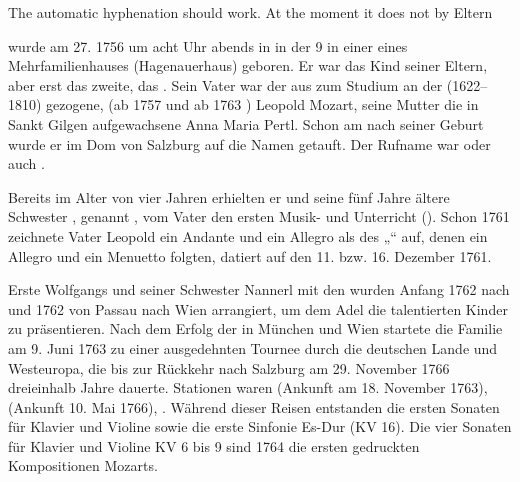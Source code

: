 \documentclass{article}
\begin{document}
{The automatic hyphenation should work.
At the moment it does not by Eltern}

 wurde am 27.  1756 um acht
Uhr abends in  in der  9 in einer
 eines Mehrfamilienhauses
(Hagenauerhaus) geboren. Er war das  Kind seiner Eltern,
aber erst das zweite, das . Sein Vater war der aus
 zum Studium an der 
(1622–1810)  gezogene,  (ab 1757  und ab 1763
) Leopold Mozart, seine Mutter die in Sankt
Gilgen aufgewachsene Anna Maria Pertl. Schon am  nach
seiner Geburt wurde er im Dom von Salzburg auf die Namen  getauft. Der Rufname war  oder auch .

Bereits im Alter von vier Jahren erhielten er und seine fünf Jahre
ältere Schwester , genannt
, vom Vater den ersten Musik- und
 Unterricht (). Schon 1761 zeichnete Vater Leopold ein Andante und ein
Allegro als des „“ auf, denen ein
Allegro und ein Menuetto folgten, datiert auf den 11. bzw. 16. Dezember
1761. 

Erste  Wolfgangs und seiner Schwester Nannerl mit
den  wurden Anfang 1762 nach  und
 1762 von Passau nach Wien arrangiert, um dem Adel die
talentierten Kinder zu präsentieren. Nach dem Erfolg der
 in München und Wien startete die Familie
am 9. Juni 1763 zu einer ausgedehnten Tournee durch die deutschen Lande
und Westeuropa, die bis zur Rückkehr nach Salzburg am 29. November 1766
dreieinhalb Jahre dauerte. Stationen waren  (Ankunft am 18. November
1763), (Ankunft
10. Mai 1766), . Während dieser Reisen entstanden
die ersten Sonaten für Klavier und Violine sowie die erste Sinfonie
Es-Dur (KV 16). Die vier Sonaten für Klavier und Violine KV 6 bis 9 sind
1764 die ersten gedruckten Kompositionen Mozarts.
\end{document}
